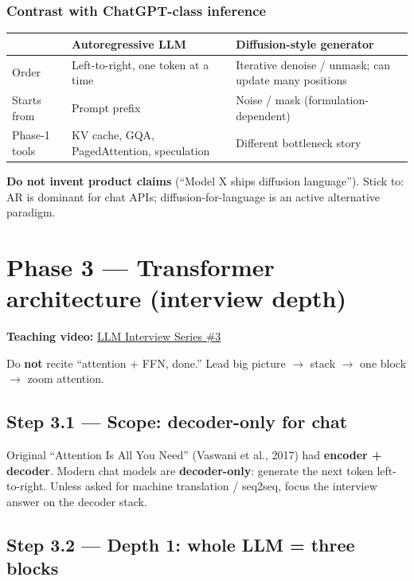 \documentclass[11pt,a4paper]{article}
\begin{document}
\subsubsection{Contrast with ChatGPT-class inference}


\begin{table}[ht]
\centering\small
\begin{tabularx}{\textwidth}{@{}YYY@{}}
\toprule
\textbf{} & \textbf{Autoregressive LLM} & \textbf{Diffusion-style generator} \\
\midrule
Order & Left-to-right, one token at a time & Iterative denoise / unmask; can update many positions \\
Starts from & Prompt prefix & Noise / mask (formulation-dependent) \\
Phase-1 tools & KV cache, GQA, PagedAttention, speculation & Different bottleneck story \\
\bottomrule
\end{tabularx}
\end{table}


\textbf{Do not invent product claims} (``Model X ships diffusion language''). Stick to: AR is dominant for chat APIs; diffusion-for-language is an active alternative paradigm.


\bigskip


\clearpage
\section{Phase 3 --- Transformer architecture (interview depth)}


\textbf{Teaching video:} \href{https://www.youtube.com/watch?v=c533te7NSpI}{LLM Interview Series \#3}


Do \textbf{not} recite ``attention + FFN, done.'' Lead big picture $\rightarrow$ stack $\rightarrow$ one block $\rightarrow$ zoom attention.


\subsection{Step 3.1 --- Scope: decoder-only for chat}


Original ``Attention Is All You Need'' (Vaswani et al., 2017) had \textbf{encoder + decoder}. Modern chat models are \textbf{decoder-only}: generate the next token left-to-right. Unless asked for machine translation / seq2seq, focus the interview answer on the decoder stack.


\subsection{Step 3.2 --- Depth 1: whole LLM = three blocks}
\end{document}
